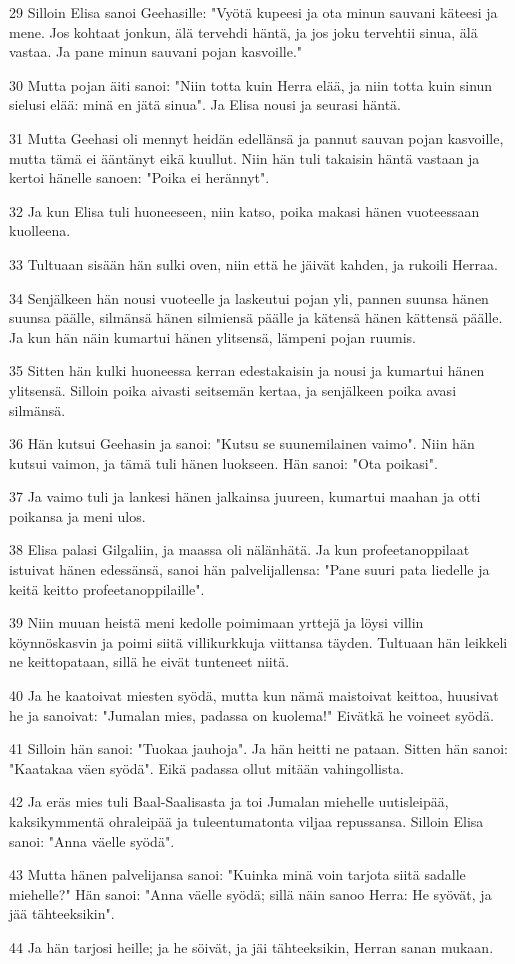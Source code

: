 \par 29 Silloin Elisa sanoi Geehasille: "Vyötä kupeesi ja ota minun sauvani käteesi ja mene. Jos kohtaat jonkun, älä tervehdi häntä, ja jos joku tervehtii sinua, älä vastaa. Ja pane minun sauvani pojan kasvoille."
\par 30 Mutta pojan äiti sanoi: "Niin totta kuin Herra elää, ja niin totta kuin sinun sielusi elää: minä en jätä sinua". Ja Elisa nousi ja seurasi häntä.
\par 31 Mutta Geehasi oli mennyt heidän edellänsä ja pannut sauvan pojan kasvoille, mutta tämä ei ääntänyt eikä kuullut. Niin hän tuli takaisin häntä vastaan ja kertoi hänelle sanoen: "Poika ei herännyt".
\par 32 Ja kun Elisa tuli huoneeseen, niin katso, poika makasi hänen vuoteessaan kuolleena.
\par 33 Tultuaan sisään hän sulki oven, niin että he jäivät kahden, ja rukoili Herraa.
\par 34 Senjälkeen hän nousi vuoteelle ja laskeutui pojan yli, pannen suunsa hänen suunsa päälle, silmänsä hänen silmiensä päälle ja kätensä hänen kättensä päälle. Ja kun hän näin kumartui hänen ylitsensä, lämpeni pojan ruumis.
\par 35 Sitten hän kulki huoneessa kerran edestakaisin ja nousi ja kumartui hänen ylitsensä. Silloin poika aivasti seitsemän kertaa, ja senjälkeen poika avasi silmänsä.
\par 36 Hän kutsui Geehasin ja sanoi: "Kutsu se suunemilainen vaimo". Niin hän kutsui vaimon, ja tämä tuli hänen luokseen. Hän sanoi: "Ota poikasi".
\par 37 Ja vaimo tuli ja lankesi hänen jalkainsa juureen, kumartui maahan ja otti poikansa ja meni ulos.
\par 38 Elisa palasi Gilgaliin, ja maassa oli nälänhätä. Ja kun profeetanoppilaat istuivat hänen edessänsä, sanoi hän palvelijallensa: "Pane suuri pata liedelle ja keitä keitto profeetanoppilaille".
\par 39 Niin muuan heistä meni kedolle poimimaan yrttejä ja löysi villin köynnöskasvin ja poimi siitä villikurkkuja viittansa täyden. Tultuaan hän leikkeli ne keittopataan, sillä he eivät tunteneet niitä.
\par 40 Ja he kaatoivat miesten syödä, mutta kun nämä maistoivat keittoa, huusivat he ja sanoivat: "Jumalan mies, padassa on kuolema!" Eivätkä he voineet syödä.
\par 41 Silloin hän sanoi: "Tuokaa jauhoja". Ja hän heitti ne pataan. Sitten hän sanoi: "Kaatakaa väen syödä". Eikä padassa ollut mitään vahingollista.
\par 42 Ja eräs mies tuli Baal-Saalisasta ja toi Jumalan miehelle uutisleipää, kaksikymmentä ohraleipää ja tuleentumatonta viljaa repussansa. Silloin Elisa sanoi: "Anna väelle syödä".
\par 43 Mutta hänen palvelijansa sanoi: "Kuinka minä voin tarjota siitä sadalle miehelle?" Hän sanoi: "Anna väelle syödä; sillä näin sanoo Herra: He syövät, ja jää tähteeksikin".
\par 44 Ja hän tarjosi heille; ja he söivät, ja jäi tähteeksikin, Herran sanan mukaan.


